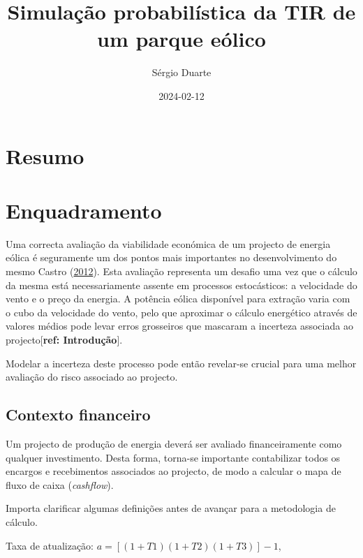 \documentclass[
  letterpaper,
  DIV=11,
  numbers=noendperiod]{scrartcl}
\title{Simulação probabilística da TIR de um parque eólico}
\author{Sérgio Duarte}
\date{2024-02-12}
\begin{document}
\maketitle
\ifdefined\Shaded\renewenvironment{Shaded}{\begin{tcolorbox}[interior hidden, borderline west={3pt}{0pt}{shadecolor}, boxrule=0pt, enhanced, sharp corners, frame hidden, breakable]}{\end{tcolorbox}}\fi

\hypertarget{resumo}{%
\section{Resumo}\label{resumo}}

\hypertarget{enquadramento}{%
\section{Enquadramento}\label{enquadramento}}

Uma correcta avaliação da viabilidade económica de um projecto de
energia eólica é seguramente um dos pontos mais importantes no
desenvolvimento do mesmo Castro (\protect\hyperlink{ref-intro}{2012}).
Esta avaliação representa um desafio uma vez que o cálculo da mesma está
necessariamente assente em processos estocásticos: a velocidade do vento
e o preço da energia. A potência eólica disponível para extração varia
com o cubo da velocidade do vento, pelo que aproximar o cálculo
energético através de valores médios pode levar erros grosseiros que
mascaram a incerteza associada ao projecto{[}\textbf{ref:
Introdução}{]}.

Modelar a incerteza deste processo pode então revelar-se crucial para
uma melhor avaliação do risco associado ao projecto.

\hypertarget{contexto-financeiro}{%
\subsection{Contexto financeiro}\label{contexto-financeiro}}

Um projecto de produção de energia deverá ser avaliado financeiramente
como qualquer investimento. Desta forma, torna-se importante
contabilizar todos os encargos e recebimentos associados ao projecto, de
modo a calcular o mapa de fluxo de caixa (\emph{cashflow}).

Importa clarificar algumas definições antes de avançar para a
metodologia de cálculo.

Taxa de atualização: \(a = [(1+T1)(1+T2)(1+T3)]-1\),
\end{document}
